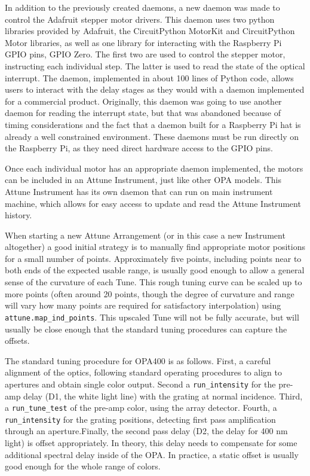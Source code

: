 In addition to the previously created daemons, a new daemon was made to control the Adafruit stepper motor drivers.
This daemon uses two python libraries provided by Adafruit, the CircuitPython MotorKit\cite{} and CircuitPython Motor\cite{} libraries, as well as one library for interacting with the Raspberry Pi GPIO pins, GPIO Zero\cite{}.
The first two are used to control the stepper motor, instructing each individual step.
The latter is used to read the state of the optical interrupt.
The daemon, implemented in about 100 lines of Python code, allows users to interact with the delay stages as they would with a daemon implemented for a commercial product.
Originally, this daemon was going to use another daemon for reading the interrupt state, but that was abandoned because of timing considerations and the fact that a daemon built for a Raspberry Pi hat is already a well constrained environment.
These daemons must be run directly on the Raspberry Pi, as they need direct hardware access to the GPIO pins.

Once each individual motor has an appropriate daemon implemented, the motors can be included in an Attune Instrument, just like other OPA models.
This Attune Instrument has its own daemon that can run on main instrument machine, which allows for easy access to update and read the Attune Instrument history.

When starting a new Attune Arrangement (or in this case a new Instrument altogether) a good initial strategy is to manually find appropriate motor positions for a small number of points.
Approximately five points, including points near to both ends of the expected usable range, is usually good enough to allow a general sense of the curvature of each Tune.
This rough tuning curve can be scaled up to more points (often around 20 points, though the degree of curvature and range will vary how many points are required for satisfactory interpolation) using \texttt{attune.map_ind_points}.
This upscaled Tune will not be fully accurate, but will usually be close enough that the standard tuning procedures can capture the offsets.

The standard tuning procedure for OPA400 is as follows.
First, a careful alignment of the optics, following standard operating procedures to align to apertures and obtain single color output.
Second a \texttt{run\_intensity} for the pre-amp delay (D1, the white light line) with the grating at normal incidence.
Third, a \texttt{run\_tune\_test} of the pre-amp color, using the array detector.
Fourth, a \texttt{run\_intensity} for the grating positions, detecting first pass amplification through an aperture.Finally, the second pass delay (D2, the delay for 400 nm light) is offset appropriately.
In theory, this delay needs to compensate for some additional spectral delay inside of the OPA.
In practice, a static offset is usually good enough for the whole range of colors.

\clearpage
